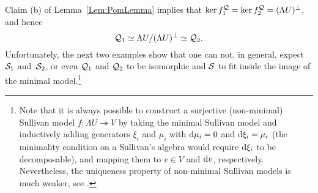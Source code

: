 \documentclass[\MainFolder/Text.tex]{subfiles}
\begin{document}
Claim (b) of Lemma~\ref{Lem:PomLemma} implies that $\ker f_1^{\mathcal{Q}} = \ker f_2^{\mathcal{Q}} = (\Lambda U)^\perp$, and hence
\[ \mathcal{Q}_1 \simeq  \Lambda U / (\Lambda U)^\perp\simeq \mathcal{Q}_2. \]
Unfortunately, the next two examples show that one can not, in general, expect~$\mathcal{S}_1$ and~$\mathcal{S}_2$, or even $\mathcal{Q}_1$ and $\mathcal{Q}_2$ to be isomorphic and $\mathcal{S}$ to fit inside the image of the minimal model.\footnote{Note that it is always possible to construct a surjective (non-minimal) Sullivan model $f: \Lambda U \twoheadrightarrow V$ by taking the minimal Sullivan model and inductively adding generators $\xi_i$ and $\mu_i$ with $\mathrm{d} \mu_i = 0$ and $\mathrm{d} \xi_i = \mu_i$ (the minimality condition on a Sullivan's algebra would require $\mathrm{d} \xi_i$ to be decomposable), and mapping them to $v\in V$ and $\mathrm{d} v$, respectively. Nevertheless, the uniqueness property of non-minimal Sullivan models is much weaker, see \cite[Lemma~2.20]{Felix2008}.}
\end{document}
